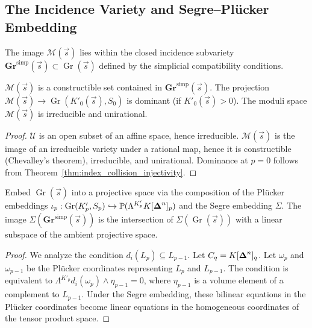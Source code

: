 \subsection{The Incidence Variety and Segre--Plücker Embedding}

The image $\mathcal{M}(\vec s)$ lies within the closed incidence
subvariety $\mathbf{Gr}^{\mathrm{simp}}(\vec s) \subset \operatorname{Gr}(\vec s)$
defined by the simplicial compatibility conditions.

\begin{theorem}\label{thm:incidence-global}
$\mathcal{M}(\vec s)$ is a constructible set contained in
$\mathbf{Gr}^{\mathrm{simp}}(\vec s)$.
The projection
$\mathcal M(\vec s)\to \operatorname{Gr}(K'_0(\vec s),S_0)$ is dominant
(if $K'_0(\vec s)>0$).
The moduli space $\mathcal{M}(\vec s)$ is irreducible and unirational.
\end{theorem}
\begin{proof}
$\mathcal{U}$ is an open subset of an affine space, hence irreducible.
$\mathcal{M}(\vec{s})$ is the image of an irreducible variety under a
rational map, hence it is constructible (Chevalley's theorem),
irreducible, and unirational. Dominance at $p=0$ follows from
Theorem~\ref{thm:index_collision_injectivity}.
\end{proof}

\begin{proposition}\label{prop:segre-linear}
Embed $\operatorname{Gr}(\vec s)$ into a projective space via the
composition of the Plücker embeddings
$\iota_p : \operatorname{Gr}(K'_p,S_p) \hookrightarrow
\mathbb{P}(\Lambda^{K'_p} K[\boldsymbol{\Delta}^n]_p)$ and the Segre embedding
$\Sigma$. The image $\Sigma(\mathbf{Gr}^{\mathrm{simp}}(\vec s))$ is the
intersection of $\Sigma(\operatorname{Gr}(\vec s))$ with a linear
subspace of the ambient projective space.
\end{proposition}

\begin{proof}
We analyze the condition $d_i(L_p) \subseteq L_{p-1}$. Let
$C_q = K[\boldsymbol{\Delta}^n]_q$. Let $\omega_p$ and $\omega_{p-1}$ be the Plücker
coordinates representing $L_p$ and $L_{p-1}$.
The condition is equivalent to
$\Lambda^{K'_p} d_i(\omega_p) \wedge \eta_{p-1} = 0$, where $\eta_{p-1}$
is a volume element of a complement to $L_{p-1}$. Under the Segre
embedding, these bilinear equations in the Plücker coordinates become
linear equations in the homogeneous coordinates of the tensor product
space.
\end{proof}


